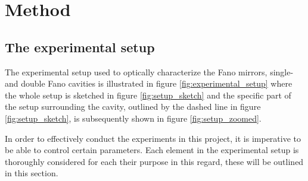 \section{Method}
\subsection{The experimental setup}

The experimental setup used to optically characterize the Fano mirrors, single- and double Fano cavities is illustrated in figure \ref{fig:experimental_setup} where the whole setup is sketched in figure \ref{fig:setup_sketch} and the specific part of the setup surrounding the cavity, outlined by the dashed line in figure \ref{fig:setup_sketch}, is subsequently shown in figure \ref{fig:setup_zoomed}. 

In order to effectively conduct the experiments in this project, it is imperative to be able to control certain parameters. Each element in the experimental setup is thoroughly considered for each their purpose in this regard, these will be outlined in this section. 

